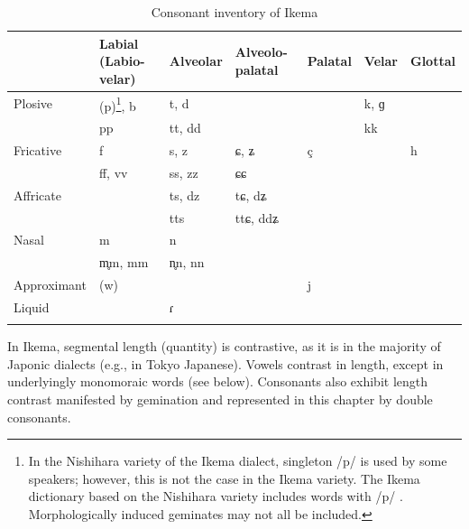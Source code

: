 \documentclass[output=paper]{langscibook}
\begin{document}
\begin{table}
\small
\begin{tabularx}{\textwidth}{l QlQlll}
\lsptoprule
 & Labial (Labio-velar) & Alveolar & Alveolo- palatal & Palatal & Velar & Glottal\\
\midrule
Plosive & (p)\footnote{In the Nishihara variety of the Ikema dialect, singleton /p/ is used by some speakers; however, this is not the case in the Ikema variety. The Ikema dictionary based on the Nishihara variety includes words with /p/ \citep{NakamaEtAl2022}. Morphologically induced geminates may not all be included.},    b & t,      d &  &  & k,       ɡ & \\
& pp & tt,    dd &  &  & kk & \\
Fricative & f & s,     z & ɕ,    ʑ & ç &  & h\\
& ff,    vv & ss,   zz & ɕɕ &  &  & \\
Affricate &  & ts,   dz & tɕ,   dʑ &  &  & \\
&  & tts & ttɕ,  ddʑ &  &  & \\
Nasal & m & n &  &  &  & \\
& m̥m,  mm & n̥n,  nn &  &  &  & \\
Approximant & (w) &  &  & j &  & \\
Liquid      &     & ɾ&  &  &  & \\
\lspbottomrule
\end{tabularx}
\caption{Consonant inventory of Ikema}
\label{tab:shinohara:2}

\end{table}

\largerpage
In Ikema, segmental length (quantity) is contrastive, as it is in the majority of Japonic dialects (e.g., in Tokyo Japanese). Vowels contrast in length, except in underlyingly monomoraic words (see below). Consonants also exhibit length contrast manifested by gemination and represented in this chapter by double consonants.
\end{document}
